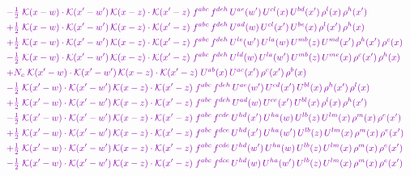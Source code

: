 \documentclass[10pt]{article}
\numberwithin{equation}{section}
\begin{document}
\begin{align}
&\quad{\color{CC}-\tfrac{1}{2}\;\mathcal{K}(x-w)\cdot\mathcal{K}(x'-w')\,\mathcal{K}(x-z)\cdot\mathcal{K}(x'-z)\;f^{abc}\,f^{deh}\,U^{ae}(w')\,U^{cl}(x)\,U^{bd}(x')\,\rho^{l}(x)\,\rho^{h}(x')}\notag\\
&\quad{\color{CC}+\tfrac{1}{2}\;\mathcal{K}(x-w)\cdot\mathcal{K}(x'-w')\,\mathcal{K}(x-z)\cdot\mathcal{K}(x'-z)\;f^{abc}\,f^{deh}\,U^{ad}(w)\,U^{cl}(x')\,U^{be}(x)\,\rho^{l}(x')\,\rho^{h}(x)}\notag\\
&\quad{\color{CC}+\tfrac{1}{2}\;\mathcal{K}(x-w)\cdot\mathcal{K}(x'-w')\,\mathcal{K}(x-z)\cdot\mathcal{K}(x'-z)\;f^{abc}\,f^{deh}\,U^{le}(w')\,U^{la}(w)\,U^{mb}(z)\,U^{md}(x')\,\rho^{h}(x')\,\rho^{c}(x)}\notag\\
&\quad{\color{CC}-\tfrac{1}{2}\;\mathcal{K}(x-w)\cdot\mathcal{K}(x'-w')\,\mathcal{K}(x-z)\cdot\mathcal{K}(x'-z)\;f^{abc}\,f^{deh}\,U^{ld}(w)\,U^{la}(w')\,U^{mb}(z)\,U^{me}(x)\,\rho^{c}(x')\,\rho^{h}(x)}\notag\\
&\quad{\color{CC}+N_c\;\mathcal{K}(x'-w)\cdot\mathcal{K}(x'-w')\,\mathcal{K}(x-z)\cdot\mathcal{K}(x'-z)\;U^{ab}(x)\,U^{ac}(x')\,\rho^{c}(x')\,\rho^{b}(x)}\notag\\
&\quad{\color{CC}-\tfrac{1}{2}\;\mathcal{K}(x'-w)\cdot\mathcal{K}(x'-w')\,\mathcal{K}(x-z)\cdot\mathcal{K}(x'-z)\;f^{abc}\,f^{deh}\,U^{ae}(w')\,U^{cd}(x')\,U^{bl}(x)\,\rho^{h}(x')\,\rho^{l}(x)}\notag\\
&\quad{\color{CC}+\tfrac{1}{2}\;\mathcal{K}(x'-w)\cdot\mathcal{K}(x'-w')\,\mathcal{K}(x-z)\cdot\mathcal{K}(x'-z)\;f^{abc}\,f^{deh}\,U^{ad}(w)\,U^{ce}(x')\,U^{bl}(x)\,\rho^{l}(x)\,\rho^{h}(x')}\notag\\
&\quad{\color{CC}-\tfrac{1}{2}\;\mathcal{K}(x'-w)\cdot\mathcal{K}(x'-w')\,\mathcal{K}(x-z)\cdot\mathcal{K}(x'-z)\;f^{abc}\,f^{cde}\,U^{hd}(x')\,U^{ha}(w)\,U^{lb}(z)\,U^{lm}(x)\,\rho^{m}(x)\,\rho^{e}(x')}\notag\\
&\quad{\color{CC}+\tfrac{1}{2}\;\mathcal{K}(x'-w)\cdot\mathcal{K}(x'-w')\,\mathcal{K}(x-z)\cdot\mathcal{K}(x'-z)\;f^{abc}\,f^{dce}\,U^{hd}(x')\,U^{ha}(w')\,U^{lb}(z)\,U^{lm}(x)\,\rho^{m}(x)\,\rho^{e}(x')}\notag\\
&\quad{\color{CC}+\tfrac{1}{2}\;\mathcal{K}(x'-w)\cdot\mathcal{K}(x'-w')\,\mathcal{K}(x-z)\cdot\mathcal{K}(x'-z)\;f^{abc}\,f^{cde}\,U^{hd}(w')\,U^{ha}(w)\,U^{lb}(z)\,U^{lm}(x)\,\rho^{m}(x)\,\rho^{e}(x')}\notag\\
&\quad{\color{CC}-\tfrac{1}{2}\;\mathcal{K}(x'-w)\cdot\mathcal{K}(x'-w')\,\mathcal{K}(x-z)\cdot\mathcal{K}(x'-z)\;f^{abc}\,f^{dce}\,U^{hd}(w)\,U^{ha}(w')\,U^{lb}(z)\,U^{lm}(x)\,\rho^{m}(x)\,\rho^{e}(x')}\notag\\

\end{align}
\end{document}
